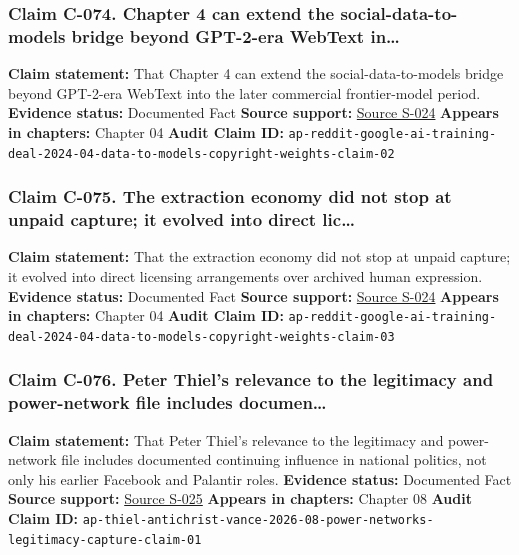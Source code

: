 \documentclass[
  american,
  11pt,
  letterpaper,
]{article}
\begin{document}
\subsubsection{Claim C-074. Chapter 4 can extend the
social-data-to-models bridge beyond GPT-2-era WebText
in\ldots{}}\label{claim-c-074-chapter-4-can-extend-the-social-data-to-models-bridge-beyond-gpt-2-era-webtext-in}

\textbf{Claim statement:} That Chapter 4 can extend the
social-data-to-models bridge beyond GPT-2-era WebText into the later
commercial frontier-model period. \textbf{Evidence status:} Documented
Fact \textbf{Source support:}
\hyperref[source-s-024-reddit-strikes-60m-deal-allowing-google-to-train-ai-models-on-its-posts-unveils-ipo-plans]{Source
S-024} \textbf{Appears in chapters:} Chapter 04 \textbf{Audit Claim ID:}
\texttt{ap-reddit-google-ai-training-deal-2024-04-data-to-models-copyright-weights-claim-02}

\subsubsection{Claim C-075. The extraction economy did not stop at
unpaid capture; it evolved into direct
lic\ldots{}}\label{claim-c-075-the-extraction-economy-did-not-stop-at-unpaid-capture-it-evolved-into-direct-lic}

\textbf{Claim statement:} That the extraction economy did not stop at
unpaid capture; it evolved into direct licensing arrangements over
archived human expression. \textbf{Evidence status:} Documented Fact
\textbf{Source support:}
\hyperref[source-s-024-reddit-strikes-60m-deal-allowing-google-to-train-ai-models-on-its-posts-unveils-ipo-plans]{Source
S-024} \textbf{Appears in chapters:} Chapter 04 \textbf{Audit Claim ID:}
\texttt{ap-reddit-google-ai-training-deal-2024-04-data-to-models-copyright-weights-claim-03}

\subsubsection{Claim C-076. Peter Thiel's relevance to the legitimacy
and power-network file includes
documen\ldots{}}\label{claim-c-076-peter-thiel-s-relevance-to-the-legitimacy-and-power-network-file-includes-documen}

\textbf{Claim statement:} That Peter Thiel's relevance to the legitimacy
and power-network file includes documented continuing influence in
national politics, not only his earlier Facebook and Palantir roles.
\textbf{Evidence status:} Documented Fact \textbf{Source support:}
\hyperref[source-s-025-thiel-brings-his-antichrist-lectures-to-the-vaticans-doorstep-and-catholic-institutions-back-away]{Source
S-025} \textbf{Appears in chapters:} Chapter 08 \textbf{Audit Claim ID:}
\texttt{ap-thiel-antichrist-vance-2026-08-power-networks-legitimacy-capture-claim-01}
\end{document}
